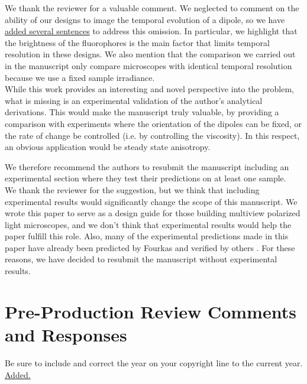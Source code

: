 \documentclass[10pt]{article}
\begin{document}
We thank the reviewer for a valuable comment. We neglected to comment on the
ability of our designs to image the temporal evolution of a dipole, so we have
\hyperlink{temporal}{\color{urlblue} added several sentences} to address this
omission. In particular, we highlight that the brightness of the fluorophores is
the main factor that limits temporal resolution in these designs. We also
mention that the comparison we carried out in the manuscript only compare microscopes
with identical temporal resolution because we use a fixed sample irradiance.\\

{\color{OE} While this work provides an interesting and novel perspective into
  the problem, what is missing is an experimental validation of the author's
  analytical derivations. This would make the manuscript truly valuable, by
  providing a comparison with experiments where the orientation of the dipoles
  can be fixed, or the rate of change be controlled (i.e. by controlling the
  viscosity). In this respect, an obvious application would be steady state
  anisotropy.}

{\color{OE} We therefore recommend the authors to resubmit the manuscript
  including an experimental section where they test their predictions on at
  least one sample.}\\

We thank the reviewer for the suggestion, but we think that including
experimental results would significantly change the scope of this manuscript. We
wrote this paper to serve as a design guide for those building multiview
polarized light microscopes, and we don't think that experimental results would
help the paper fulfill this role. Also, many of the experimental predictions
made in this paper have already been predicted by Fourkas \cite{fourkas2001} and
verified by others \cite{lu2008}. For these reasons, we have decided to resubmit
the manuscript without experimental results.

\section*{Pre-Production Review Comments and Responses}

{\color{OE} Be sure to include and correct the year on your copyright line to
  the current year.}\\

\hyperlink{copyright}{\color{urlblue} Added.}\\
\end{document}
